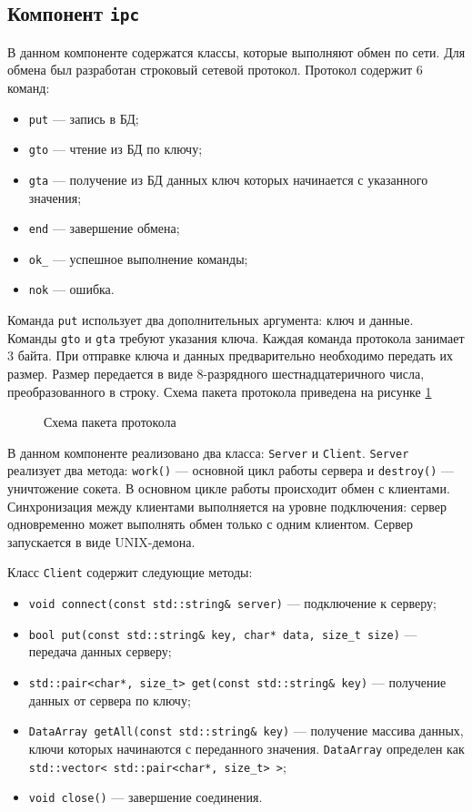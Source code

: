 \subsection{Компонент \texttt{ipc}}
В данном компоненте содержатся классы, которые выполняют обмен по сети. Для обмена был разработан строковый сетевой протокол. Протокол содержит 6 команд: 
\begin{itemize}
\item \texttt{put} --- запись в БД;
\item \texttt{gto} --- чтение из БД по ключу;
\item \texttt{gta} --- получение из БД данных ключ которых начинается с указанного значения;
\item \texttt{end} --- завершение обмена;
\item \texttt{ok_} --- успешное выполнение команды;
\item \texttt{nok} --- ошибка.
\end{itemize}
Команда \texttt{put} использует два дополнительных аргумента: ключ и данные. Команды \texttt{gto} и \texttt{gta} требуют указания ключа. Каждая команда протокола занимает 3 байта. При отправке ключа и данных предварительно необходимо передать их размер. Размер передается в виде 8-разрядного шестнадцатеричного числа, преобразованного в строку. Схема пакета протокола приведена на рисунке \ref{image:packageStructure}
\begin{figure}[h!]
\caption{Схема пакета протокола}
\label{image:packageStructure}
\end{figure}

В данном компоненте реализовано два класса: \texttt{Server} и \texttt{Client}. \texttt{Server} реализует два метода: \texttt{work()} --- основной цикл работы сервера и \texttt{destroy()} --- уничтожение сокета. В основном цикле работы происходит обмен с клиентами. Синхронизация между клиентами выполняется на уровне подключения: сервер одновременно может выполнять обмен только с одним клиентом. Сервер запускается в виде UNIX-демона.

Класс \texttt{Client} содержит следующие методы: 
\begin{itemize}
\item \texttt{void connect(const std::string\& server)} --- подключение к серверу;
\item \texttt{bool put(const std::string\& key, char* data, size_t size)} --- передача данных серверу;
\item \texttt{std::pair<char*, size_t> get(const std::string\& key)} --- получение данных от сервера по ключу;
\item \texttt{DataArray getAll(const std::string\& key)} --- получение массива данных, ключи которых начинаются с переданного значения. \texttt{DataArray} определен как \texttt{std::vector< std::pair<char*, size_t> >};
\item \texttt{void close()} --- завершение соединения.
\end{itemize}

